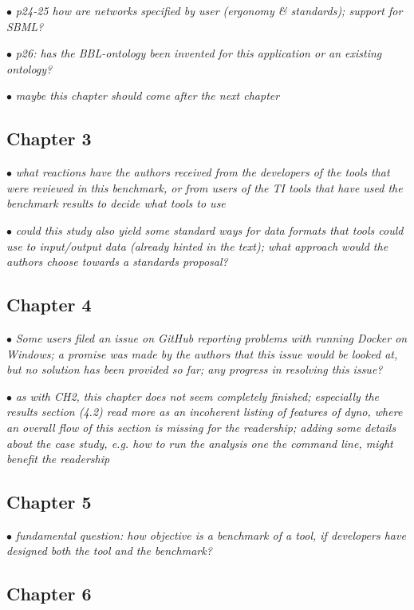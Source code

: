 \documentclass[10pt]{article}
\newcommand{\exam}[2][\  ]{\hspace{0pt}\marginpar{\color{red}#1}$\bullet$ \textit{#2}}
\newcommand{\imp}[1]{{\color{red} #1}}
\newcommand{\bigexclaim}{\raisebox{-0.1em}{\BigTriangleUp}\hspace{-0.32em}\llap{\small\textbf{!}}\hspace{0.32em}}
\newcommand{\tagimp}{\bigexclaim}
\begin{document}
{{\exam{p24-25 how are networks specified by user (ergonomy \& standards); support for SBML?}

\exam{p26: has the BBL-ontology been invented for this application or an existing ontology?}

\exam{maybe this chapter should come after the next chapter}

\subsection{Chapter 3}

\exam{what reactions have the authors received from the developers of the tools that were reviewed in
	this benchmark, or from users of the TI tools that have used the benchmark results to decide what
	tools to use}

\exam{could this study also yield some standard ways for data formats that tools could use to input/output
	data (already hinted in the text); what approach would the authors choose towards a standards
	proposal?}

\subsection{Chapter 4}

\exam{Some users filed an issue on GitHub reporting problems with running Docker on Windows; a
	promise was made by the authors that this issue would be looked at, but no solution has been
	provided so far; any progress in resolving this issue?}

\exam{as with CH2, this chapter does not seem completely finished; especially the results section (4.2) read more as an incoherent listing of features of dyno, where an overall flow of this section is missing for the readership; adding some details about the case study, e.g. how to run the analysis one the command line, might benefit the readership}

\subsection{Chapter 5}

\exam[\tagimp]{fundamental question: \imp{how objective is a benchmark of a tool, if developers have designed both the tool and the benchmark?}}

\subsection{Chapter 6}

}}
\end{document}
